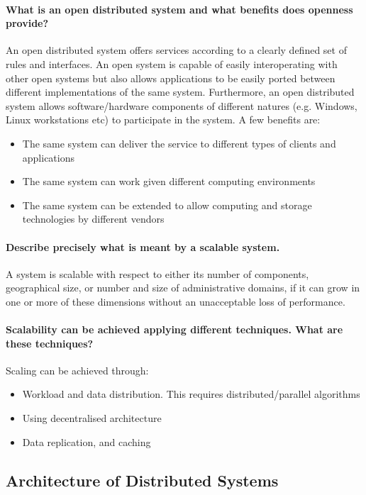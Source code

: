 \paragraph{What is an open distributed system and what benefits does openness provide?}
An open distributed system offers services according to a clearly defined set of rules and interfaces. An open system is capable of easily interoperating with other open systems but also allows applications to be easily ported between different implementations of the same system. Furthermore, an open distributed system allows software/hardware components of different natures (e.g. Windows, Linux workstations etc) to participate in the system. A few benefits are:
\begin{itemize}
	\item The same system can deliver the service to different types of clients and applications
	\item The same system can work given different computing environments
	\item The same system can be extended to allow computing and storage technologies by different vendors	
\end{itemize}


\paragraph{Describe precisely what is meant by a scalable system.}
A system is scalable with respect to either its number of components, geographical size, or number and size of administrative domains, if it can grow in one or more of these dimensions without an unacceptable loss of performance.

\paragraph{Scalability can be achieved applying different techniques. What are these techniques?}
Scaling can be achieved through:
\begin{itemize}
	\item Workload and data distribution. This requires distributed/parallel algorithms
	\item Using decentralised architecture
	\item Data replication, and caching	
\end{itemize}


\subsection{Architecture of Distributed Systems}


